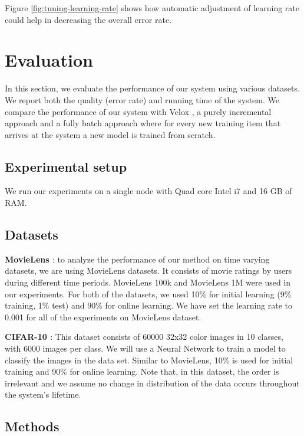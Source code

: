 \documentclass{sig-alternate-05-2015}
\begin{document}
Figure \ref{fig:tuning-learning-rate} shows how automatic adjustment of learning rate could help in decreasing the overall error rate.



\section{Evaluation} \label{evaluation}
In this section, we evaluate the performance of our system using various datasets. 
We report both the quality (error rate) and running time of the system. 
We compare the performance of our system with Velox \cite{crankshaw2014missing}, a purely incremental approach and a fully batch approach where for every new training item that arrives at the system a new model is trained from scratch.

\subsection{Experimental setup}
We run our experiments on a single node with Quad core Intel i7 and 16 GB of RAM. 

\subsection{Datasets}
\textbf{MovieLens \cite{harper2016movielens}}: to analyze the performance of our method on time varying datasets, we are using MovieLens datasets. 
It consists of movie ratings by users during different time periods. 
MovieLens 100k and MovieLens 1M were used in our experiments. 
For both of the datasets, we used 10\% for initial learning (9\% training, 1\% test) and 90\% for online learning. 
We have set the learning rate to 0.001 for all of the experiments on MovieLens dataset.

\textbf{CIFAR-10 \cite{krizhevsky2009learning}}: This dataset consists of 60000 32x32 color images in 10 classes, with 6000 images per class. We will use a Neural Network to train a model to classify the images in the data set. Similar to MovieLens, 10\% is used for initial training and 90\% for online learning. Note that, in this dataset, the order is irrelevant and we assume no change in distribution of the data occurs throughout the system's lifetime. 


\subsection{Methods}
\end{document}
